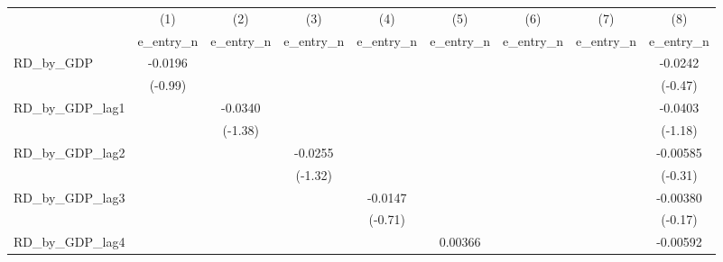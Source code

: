 {
\def\sym#1{\ifmmode^{#1}\else\(^{#1}\)\fi}
\begin{tabular}{l*{8}{c}}
\toprule
          &\multicolumn{1}{c}{(1)}&\multicolumn{1}{c}{(2)}&\multicolumn{1}{c}{(3)}&\multicolumn{1}{c}{(4)}&\multicolumn{1}{c}{(5)}&\multicolumn{1}{c}{(6)}&\multicolumn{1}{c}{(7)}&\multicolumn{1}{c}{(8)}\\
          &\multicolumn{1}{c}{e\_entry\_n}&\multicolumn{1}{c}{e\_entry\_n}&\multicolumn{1}{c}{e\_entry\_n}&\multicolumn{1}{c}{e\_entry\_n}&\multicolumn{1}{c}{e\_entry\_n}&\multicolumn{1}{c}{e\_entry\_n}&\multicolumn{1}{c}{e\_entry\_n}&\multicolumn{1}{c}{e\_entry\_n}\\
\midrule
RD\_by\_GDP &  -0.0196         &                  &                  &                  &                  &                  &                  &  -0.0242         \\
          &  (-0.99)         &                  &                  &                  &                  &                  &                  &  (-0.47)         \\
\addlinespace
RD\_by\_GDP\_lag1&                  &  -0.0340         &                  &                  &                  &                  &                  &  -0.0403         \\
          &                  &  (-1.38)         &                  &                  &                  &                  &                  &  (-1.18)         \\
\addlinespace
RD\_by\_GDP\_lag2&                  &                  &  -0.0255         &                  &                  &                  &                  & -0.00585         \\
          &                  &                  &  (-1.32)         &                  &                  &                  &                  &  (-0.31)         \\
\addlinespace
RD\_by\_GDP\_lag3&                  &                  &                  &  -0.0147         &                  &                  &                  & -0.00380         \\
          &                  &                  &                  &  (-0.71)         &                  &                  &                  &  (-0.17)         \\
\addlinespace
RD\_by\_GDP\_lag4&                  &                  &                  &                  &  0.00366         &                  &                  & -0.00592         \\

\end{tabular}}
